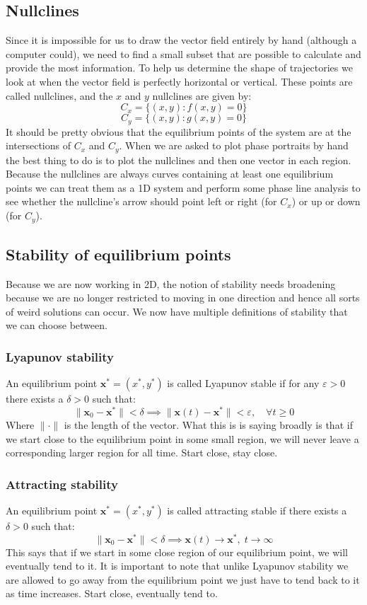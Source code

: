 \documentclass[12pt]{article}
\begin{document}
\subsection*{Nullclines}
Since it is impossible for us to draw the vector field entirely by hand (although a computer could), we need to find a small subset that are possible to calculate and provide the most information. To help us determine the shape of trajectories we look at when the vector field is perfectly horizontal or vertical. These points are called nullclines, and the \(x\) and \(y\) nullclines are given by:
\[C_x=\{(x,y):f(x,y)=0\}\]
\[C_y=\{(x,y):g(x,y)=0\}\]
It should be pretty obvious that the equilibrium points of the system are at the intersections of \(C_x\) and \(C_y\). When we are asked to plot phase portraits by hand the best thing to do is to plot the nullclines and then one vector in each region. Because the nullclines are always curves containing at least one equilibrium points we can treat them as a 1D system and perform some phase line analysis to see whether the nullcline's arrow should point left or right (for \(C_x\)) or up or down (for \(C_y\)).
\subsection*{Stability of equilibrium points}
Because we are now working in 2D, the notion of stability needs broadening because we are no longer restricted to moving in one direction and hence all sorts of weird solutions can occur. We now have multiple definitions of stability that we can choose between.
\subsubsection*{Lyapunov stability}
An equilibrium point \(\textbf{x}^*=(x^*,y^*)\) is called Lyapunov stable if for any \(\varepsilon>0\) there exists a \(\delta>0\) such that:
\[\|\textbf{x}_0-\textbf{x}^*\|<\delta\implies\|\textbf{x}(t)-\textbf{x}^*\|<\varepsilon,\quad\forall t\geq 0\]
Where \(\|\cdot\|\) is the length of the vector. What this is is saying broadly is that if we start close to the equilibrium point in some small region, we will never leave a corresponding larger region for all time. Start close, stay close.
\subsubsection*{Attracting stability}
An equilibrium point \(\textbf{x}^*=(x^*,y^*)\) is called attracting stable if there exists a \(\delta>0\) such that:
\[\|\textbf{x}_0-\textbf{x}^*\|<\delta\implies\textbf{x}(t)\to\textbf{x}^*,\;t\to \infty\]
This says that if we start in some close region of our equilibrium point, we will eventually tend to it. It is important to note that unlike Lyapunov stability we are allowed to go away from the equilibrium point we just have to tend back to it as time increases. Start close, eventually tend to.
\end{document}
